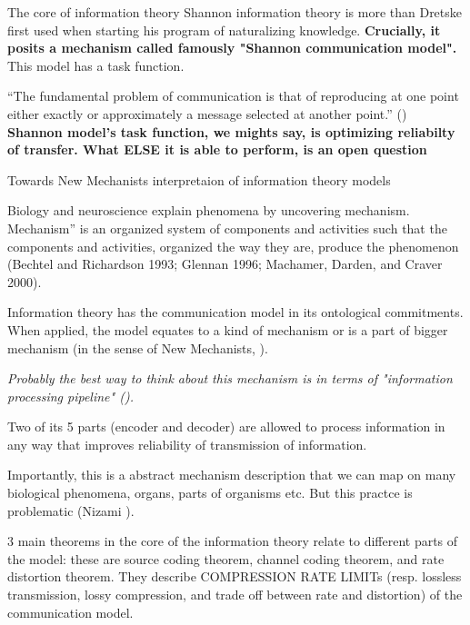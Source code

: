 \documentclass[10pt, aspectratio=169, handout]{beamer}
\begin{document}
\begin{frame}[label=core_info]{The core of information theory}
Shannon information theory is more than Dretske  first used when starting his program of naturalizing knowledge.  
    \textbf{Crucially, it posits a mechanism called famously "Shannon communication model".}  This model has a task function.

“The fundamental problem of communication is that of reproducing
at one point either exactly or approximately a message selected at
another point.” (\cite{shannon_mathematical_1948})
\textbf{
Shannon model's task function, we mights say, is  optimizing reliabilty of transfer. What ELSE it is able to perform, is an open question}
    


\end{frame}




\begin{frame}[label=new_mechanists]{Towards New Mechanists interpretaion of information theory models}

Biology and neuroscience explain phenomena by uncovering mechanism. Mechanism” is  an organized system of components and activities such that the components and activities, organized the way they are, produce the phenomenon (Bechtel and Richardson 1993; Glennan 1996; Machamer, Darden, and Craver 2000).

Information theory has the communication model in its ontological commitments. When applied, the model equates to a kind of mechanism or is a part of bigger mechanism (in the sense of New Mechanists, \cite{machamer_thinking_2000,glennan_rethinking_2002}).
    
   \emph{ Probably the best way to think about this mechanism is in terms of "information processing pipeline" (\cite{martinez_representations_2019}).}

    Two of its 5 parts (encoder and decoder) are allowed to process information in any way that improves reliability of transmission of information.

    Importantly, this is a abstract mechanism description that we can map on many biological phenomena, organs, parts of organisms etc. But this practce is problematic (Nizami \cite{nizami_information_2019}).

    3 main theorems in the core of the information theory  relate to  different parts of the model: these are source coding theorem, channel coding theorem, and rate distortion theorem. They describe COMPRESSION  RATE LIMITs (resp. lossless transmission, lossy compression, and trade off between rate and distortion) of the communication model.
\end{frame}
\end{document}
